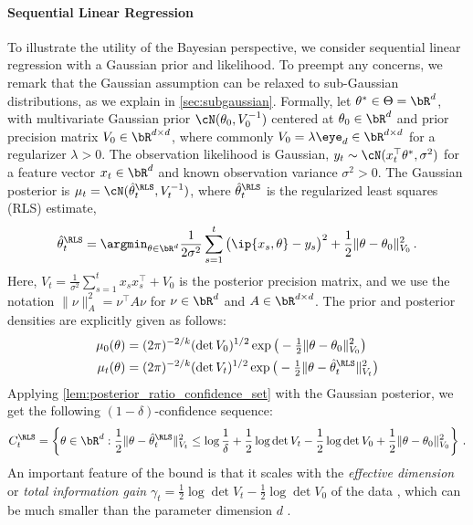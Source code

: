 \paragraph{Sequential Linear Regression} 
To illustrate the utility of the Bayesian perspective, we consider sequential linear regression with a Gaussian prior and likelihood. To preempt any concerns, we remark that the Gaussian assumption can be relaxed to sub-Gaussian distributions, as we explain in \cref{sec:subgaussian}. Formally, let $\theta^* \in \Theta = \bR^d$, with multivariate Gaussian prior $\cN(\theta_0, V_0^{-1})$ centered at $\theta_0 \in \bR^d$ and prior precision matrix $V_0 \in \bR^{d \times d}$, where commonly $V_0 = \lambda \eye_d \in \bR^{d\times d}$ for a regularizer $\lambda > 0$. The observation likelihood is Gaussian,  $y_t \sim \cN(x_t^\top\theta^*, \sigma^2)$ for a feature vector $x_t \in \bR^d$ and known observation variance $\sigma^2 > 0$. The Gaussian posterior is $\mu_t = \cN(\hat \theta_t^\RLS, V_t^{-1})$, where $\hat \theta_t^\RLS$ is the regularized least squares (RLS) estimate,
\begin{align*}
\hat \theta_t^\RLS = \argmin_{\theta \in \bR^d} \frac{1}{2 \sigma^2} \sum_{s=1}^t \big(\ip{x_s, \theta} - y_s\big)^2 + \frac{1}{2} \|\theta - \theta_0\|_{V_0}^2\,.
\end{align*}
Here, $V_t = \frac{1}{\sigma^2}\sum_{s=1}^t x_s x_s^\top + V_0$ is the posterior precision matrix, and we use the notation $\|\nu\|_A^2 = \nu^\top A \nu$ for $\nu \in \bR^d$ and $A \in \bR^{d\times d}$. The prior and posterior densities are explicitly given as follows:
\begin{align*}
    \mu_0(\theta) &= (2 \pi)^{-2/k} (\det V_0)^{1/2} \exp\big(- \tfrac{1}{2}\|\theta - \theta_0\|_{V_0}^2 \big) \\
    \mu_t(\theta) &= (2 \pi)^{-2/k} (\det V_t)^{1/2} \exp\big(- \tfrac{1}{2}\|\theta - \hat \theta_t^\RLS\|_{V_t}^2 \big)
\end{align*}
Applying \cref{lem:posterior_ratio_confidence_set} with the Gaussian posterior, we get the following $(1-\delta)$-confidence sequence:
\begin{align*}
    C_t^\RLS = \left\{ \theta \in \bR^d : \frac{1}{2}\|\theta - \hat \theta_t^\RLS\|_{V_t}^2 \leq \log \frac{1}{\delta} + \frac{1}{2}\log \det V_t - \frac{1}{2}\log \det V_0 + \frac{1}{2}\|\theta  - \theta_0\|_{V_0}^2 \right\}\,.
\end{align*}
An important feature of the bound is that it scales with the \emph{effective dimension} or \emph{total information gain} $\gamma_t = \frac{1}{2}\log \det V_t - \frac{1}{2}\log \det V_0$ of the data \citep[c.f.~][]{huang2021short}, which can be much smaller than the parameter dimension $d$ \citep{srinivas2009gaussian}. 
